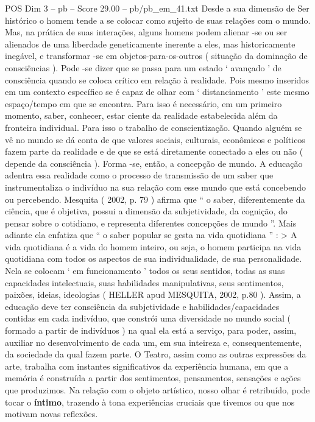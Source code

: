\begin{textsample}{POS Dim 3 – pb – Score 29.00 – pb/pb\_em\_41.txt}
Desde a sua dimensão de Ser histórico o homem tende a se colocar como sujeito de suas relações com o mundo.
Mas, na prática de suas interações, alguns homens podem alienar -se ou ser alienados de uma liberdade geneticamente inerente a eles, mas historicamente inegável, e transformar -se em objetos-para-os-outros ( situação da dominação de consciências ).
Pode -se dizer que se passa para um estado ‘ avançado ’ de consciência quando se coloca crítico em relação à realidade.
Pois mesmo inseridos em um contexto específico se é capaz de olhar com ‘ distanciamento ’ este mesmo espaço/tempo em que se encontra.
Para isso é necessário, em um primeiro momento, saber, conhecer, estar ciente da realidade estabelecida além da fronteira individual.
Para isso o trabalho de conscientização.
Quando alguém se vê no mundo se dá conta de que valores sociais, culturais, econômicos e políticos fazem parte da realidade e de que se está diretamente conectado a eles ou não ( depende da consciência ).
Forma -se, então, a concepção de mundo.
A educação adentra essa realidade como o processo de transmissão de um saber que instrumentaliza o indivíduo na sua relação com esse mundo que está concebendo ou percebendo.
Mesquita ( 2002, p. 79 ) afirma que “ o saber, diferentemente da ciência, que é objetiva, possui a dimensão da subjetividade, da cognição, do pensar sobre o cotidiano, e representa diferentes concepções de mundo ”.
Mais adiante ela enfatiza que “ o saber popular se gesta na vida quotidiana ” : > A vida quotidiana é a vida do homem inteiro, ou seja, o homem participa na vida quotidiana com todos os aspectos de sua individualidade, de sua personalidade.
Nela se colocam ‘ em funcionamento ’ todos os seus sentidos, todas as suas capacidades intelectuais, suas habilidades manipulativas, seus sentimentos, paixões, ideias, ideologias ( HELLER apud MESQUITA, 2002, p.80 ).
Assim, a educação deve ter consciência da subjetividade e habilidades/capacidades contidas em cada indivíduo, que constrói uma diversidade no mundo social ( formado a partir de indivíduos ) na qual ela está a serviço, para poder, assim, auxiliar no desenvolvimento de cada um, em sua inteireza e, consequentemente, da sociedade da qual fazem parte.
O Teatro, assim como as outras expressões da arte, trabalha com instantes significativos da experiência humana, em que a memória é construída a partir dos sentimentos, pensamentos, sensações e ações que produzimos.
Na relação com o objeto artístico, nosso olhar é retribuído, pode tocar o \textbf{íntimo}, trazendo à tona experiências cruciais que tivemos ou que nos motivam novas reflexões.

\end{textsample}

